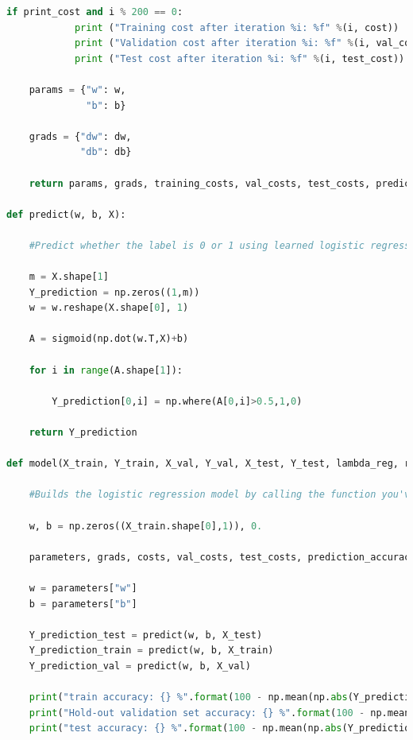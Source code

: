 \documentclass{article} %
\begin{document}
{\begin{lstlisting}[language=Python]
        if print_cost and i % 200 == 0:
            print ("Training cost after iteration %i: %f" %(i, cost))
            print ("Validation cost after iteration %i: %f" %(i, val_cost))
            print ("Test cost after iteration %i: %f" %(i, test_cost))
    
    params = {"w": w,
              "b": b}
    
    grads = {"dw": dw,
             "db": db}
    
    return params, grads, training_costs, val_costs, test_costs, prediction_accuracy_early_train, prediction_accuracy_early_val, prediction_accuracy_early_test

def predict(w, b, X):

    #Predict whether the label is 0 or 1 using learned logistic regression parameters (w, b)
    
    m = X.shape[1]
    Y_prediction = np.zeros((1,m))
    w = w.reshape(X.shape[0], 1)
    
    A = sigmoid(np.dot(w.T,X)+b)
    
    for i in range(A.shape[1]):
        
        Y_prediction[0,i] = np.where(A[0,i]>0.5,1,0)
    
    return Y_prediction

def model(X_train, Y_train, X_val, Y_val, X_test, Y_test, lambda_reg, reg_type, num_iterations = 5000, learning_rate = 0.5, print_cost = True, early_stopping = True):

    #Builds the logistic regression model by calling the function you've implemented previously
    
    w, b = np.zeros((X_train.shape[0],1)), 0.
    
    parameters, grads, costs, val_costs, test_costs, prediction_accuracy_early_train, prediction_accuracy_early_val, prediction_accuracy_early_test = optimize(w, b, X_train, Y_train, X_val, Y_val, X_test, Y_test, lambda_reg, reg_type, num_iterations, learning_rate, print_cost = True, early_stopping = True)
    
    w = parameters["w"]
    b = parameters["b"]
    
    Y_prediction_test = predict(w, b, X_test)
    Y_prediction_train = predict(w, b, X_train)
    Y_prediction_val = predict(w, b, X_val)

    print("train accuracy: {} %".format(100 - np.mean(np.abs(Y_prediction_train - Y_train)) * 100))
    print("Hold-out validation set accuracy: {} %".format(100 - np.mean(np.abs(Y_prediction_val - Y_val)) * 100))
    print("test accuracy: {} %".format(100 - np.mean(np.abs(Y_prediction_test - Y_test)) * 100))


\end{lstlisting}}
\end{document}
